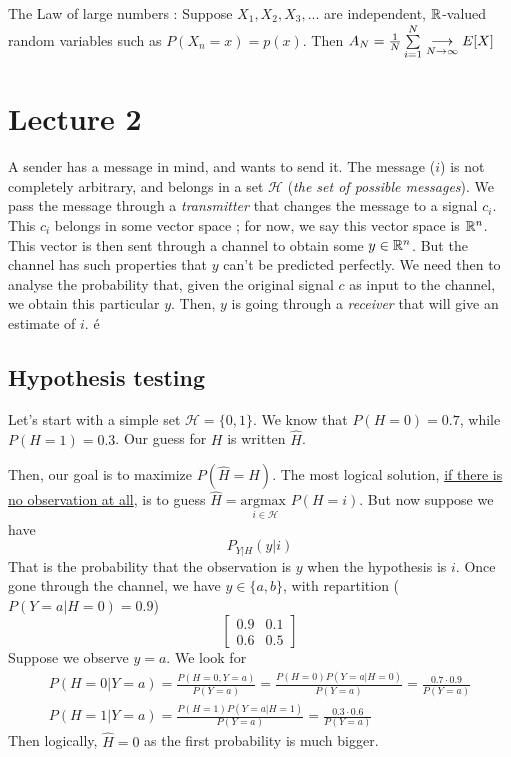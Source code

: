 \documentclass[11pt,a4paper]{article}
\begin{document}
The Law of large numbers : Suppose $X_1,X_2,X_3,...$ are independent, $\R$-valued random variables such as $P(X_n = x) = p(x)$. Then $A_N = \frac{1}{N}\somme{N}{i=1} \underset{N\to\infty}{\longrightarrow} E[X]$

\section{Lecture 2}
A sender has a message in mind, and wants to send it. The message ($i$) is not completely arbitrary, and belongs in a set $\mathcal{H}$ (\textit{the set of possible messages}). We pass the message through a \textit{transmitter} that changes the message to a signal $c_i$. This $c_i$ belongs in some vector space ; for now, we say this vector space is $\rn$. This vector is then sent through a channel to obtain some $y \in \rn$. But the channel has such properties that $y$ can't be predicted perfectly. We need then to analyse the probability that, given the original signal $c$ as input to the channel, we obtain this particular $y$. Then, $y$ is going through a \textit{receiver} that will give an estimate of $i$. é

\subsection{Hypothesis testing}
Let's start with a simple set $\mathcal{H} = \{0,1\}$. We know that $P(H=0) = 0.7$, while $P(H=1) = 0.3$. Our guess for $H$ is written $\hat{H}$. 

Then, our goal is to maximize $P(\hat{H} = H)$. The most logical solution, \uline{if there is no observation at all}, is to guess $\hat{H} = \underset{i \in \mathcal{H}}{\text{argmax }}P(H=i)$. But now suppose we have 
\[P_{Y|H}(y|i)\]
That is the probability that the observation is $y$ when the hypothesis is $i$. Once gone through the channel, we have $y \in \{a,b\}$, with repartition ($P(Y=a | H=0) = 0.9$)
\[\begin{bmatrix}
    0.9 & 0.1\\
    0.6 & 0.5
\end{bmatrix}\] Suppose we observe $y=a$. We look for
\begin{align*}
    P(H=0 | Y=a) = \frac{P(H=0,Y=a)}{P(Y=a)} = \frac{P(H=0)P(Y=a|H=0)}{P(Y=a)} = \frac{0.7 \cdot 0.9}{P(Y=a)}\\
    P(H=1|Y=a) = \frac{P(H=1)P(Y=a|H=1)}{P(Y=a)} = \frac{0.3\cdot0.6}{P(Y=a)}
\end{align*}
Then logically, $\hat{H} = 0$ as the first probability is much bigger.
\end{document}
